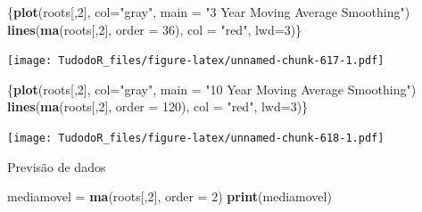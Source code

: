 \documentclass[
]{book}
\newenvironment{Shaded}{\begin{snugshade}}{\end{snugshade}}
\newcommand{\DataTypeTok}[1]{\textcolor[rgb]{0.13,0.29,0.53}{#1}}
\newcommand{\DecValTok}[1]{\textcolor[rgb]{0.00,0.00,0.81}{#1}}
\newcommand{\KeywordTok}[1]{\textcolor[rgb]{0.13,0.29,0.53}{\textbf{#1}}}
\newcommand{\NormalTok}[1]{#1}
\newcommand{\StringTok}[1]{\textcolor[rgb]{0.31,0.60,0.02}{#1}}
\begin{document}
\begin{Shaded}
\begin{Highlighting}[]
\NormalTok{\{}\KeywordTok{plot}\NormalTok{(roots[,}\DecValTok{2}\NormalTok{], }\DataTypeTok{col=}\StringTok{"gray"}\NormalTok{, }\DataTypeTok{main =} \StringTok{"3 Year Moving Average Smoothing"}\NormalTok{)}
\KeywordTok{lines}\NormalTok{(}\KeywordTok{ma}\NormalTok{(roots[,}\DecValTok{2}\NormalTok{], }\DataTypeTok{order =} \DecValTok{36}\NormalTok{), }\DataTypeTok{col =} \StringTok{"red"}\NormalTok{, }\DataTypeTok{lwd=}\DecValTok{3}\NormalTok{)\}}
\end{Highlighting}
\end{Shaded}

\texttt{[image: TudodoR\_files/figure-latex/unnamed-chunk-617-1.pdf]}

\begin{Shaded}
\begin{Highlighting}[]
\NormalTok{\{}\KeywordTok{plot}\NormalTok{(roots[,}\DecValTok{2}\NormalTok{], }\DataTypeTok{col=}\StringTok{"gray"}\NormalTok{, }\DataTypeTok{main =} \StringTok{"10 Year Moving Average Smoothing"}\NormalTok{)}
\KeywordTok{lines}\NormalTok{(}\KeywordTok{ma}\NormalTok{(roots[,}\DecValTok{2}\NormalTok{], }\DataTypeTok{order =} \DecValTok{120}\NormalTok{), }\DataTypeTok{col =} \StringTok{"red"}\NormalTok{, }\DataTypeTok{lwd=}\DecValTok{3}\NormalTok{)\}}
\end{Highlighting}
\end{Shaded}

\texttt{[image: TudodoR\_files/figure-latex/unnamed-chunk-618-1.pdf]}

Previsão de dados

\begin{Shaded}
\begin{Highlighting}[]
\NormalTok{mediamovel =}\StringTok{ }\KeywordTok{ma}\NormalTok{(roots[,}\DecValTok{2}\NormalTok{], }\DataTypeTok{order =} \DecValTok{2}\NormalTok{)}
\KeywordTok{print}\NormalTok{(mediamovel)}
\end{Highlighting}
\end{Shaded}
\end{document}
